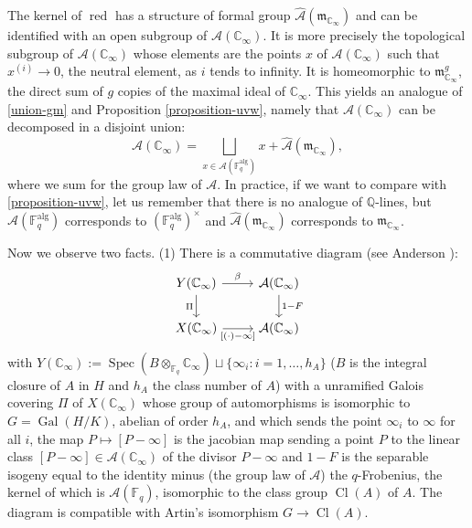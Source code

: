 \documentclass[11pt]{amsart}
\numberwithin{equation}{section}
\newcommand{\FF}{\mathbb{F}}
\newcommand{\CC}{\mathbb{C}}
\newcommand{\QQ}{\mathbb{Q}}
\begin{document}
The kernel of $\operatorname{red}$ has a structure of formal group $\widehat{\mathcal{A}}(\mathfrak{m}_{\CC_\infty})$ and can be identified with an open subgroup of $\mathcal{A}(\CC_\infty)$. It is more precisely
the topological subgroup of $\mathcal{A}(\CC_\infty)$ whose elements are the points $x$ of $\mathcal{A}(\CC_\infty)$
such that $x^{(i)}\rightarrow 0$, the neutral element, as $i$ tends to infinity. It is homeomorphic to $\mathfrak{m}_{\CC_\infty}^g$, the direct sum of $g$ copies of the maximal ideal of $\CC_\infty$. This yields an analogue of \eqref{union-gm} and Proposition \ref{proposition-uvw}, namely that $\mathcal{A}(\CC_\infty)$ can be decomposed in a disjoint union:
\begin{equation}
\mathcal{A}(\CC_\infty)=\bigsqcup_{x\in\mathcal{A}(\FF_q^{\text{alg}})}x+\widehat{\mathcal{A}}(\mathfrak{m}_{\CC_\infty}),
\end{equation}
where we sum for the group law of $\mathcal{A}$. In practice, if we want to compare with \eqref{proposition-uvw}, let us remember that there is no analogue of $\QQ$-lines, but $\mathcal{A}(\FF_q^{\text{alg}})$ corresponds to $(\FF_q^{\text{alg}})^\times$
and $\widehat{\mathcal{A}}(\mathfrak{m}_{\CC_\infty})$ corresponds to $\mathfrak{m}_{\CC_\infty}$. 

Now we observe two facts.
(1) There is a commutative diagram (see Anderson \cite[\S 3.1]{AND2}):
\begin{equation}\label{Lang-torsor}
\begin{tikzcd}
Y(\CC_\infty) \arrow[r, "\beta"] \arrow[d, "\Pi"'] & \mathcal{A}(\CC_\infty) \arrow[d, "1-F"] \\
X(\CC_\infty) \arrow[r, "{[}(\cdot)-\infty{]}"'] & \mathcal{A}(\CC_\infty)
\end{tikzcd}
\end{equation}
with $Y(\CC_\infty):=\operatorname{Spec}(B\otimes_{\FF_q}\CC_\infty)\sqcup\{\infty_i:i=1,\ldots,h_A\}$ ($B$ is the integral closure of $A$ in $H$ and $h_A$ the class number of $A$) with a unramified Galois covering $\Pi$ of $X(\CC_\infty)$ whose group of automorphisms is isomorphic to $G=\operatorname{Gal}(H/K)$, abelian of order $h_A$, and which sends the point $\infty_i$ to $\infty$ for all $i$, the map $P\mapsto[P-\infty]$
is the jacobian map sending a point $P$ to the linear class $[P-\infty]\in \mathcal{A}(\CC_\infty)$ of the divisor $P-\infty$ and $1-F$ is the separable isogeny equal to the
identity minus (the group law of $\mathcal{A}$) the $q$-Frobenius, the kernel of which is $\mathcal{A}(\FF_q)$, isomorphic to the class group $\operatorname{Cl}(A)$ of $A$. The diagram is compatible with Artin's isomorphism $G\rightarrow\operatorname{Cl}(A)$.
\end{document}
